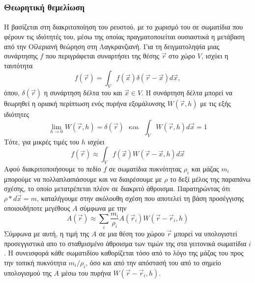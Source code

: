 \subsubsection{Θεωρητική θεμελίωση}
\paragraph{} Η  βασίζεται στη διακριτοποίηση του ρευστού, με το χωρισμό του σε
σωματίδια που φέρουν τις ιδιότητές του, μέσω της οποίας πραγματοποιείται ουσιαστικά η
μετάβαση από την Οϊλεριανή θεώρηση στη Λαγκρανζιανή. Για τη δειγματοληψία μιας συνάρτησης
$f$ που περιγράφεται συναρτήσει της θέσης $\vec{r}$ στο χώρο $V$, ισχύει η ταυτότητα
\begin{equation}
  f(\vec{r}) = \int_Vf(\vec{x}) \delta(\vec{r} - \vec{x}) d\vec{x},
\end{equation}
όπου, $\delta(\vec{r})$ η συνάρτηση δέλτα του  και $\vec{x} \in V$. Η συνάρτηση
δέλτα μπορεί να θεωρηθεί η οριακή περίπτωση ενός πυρήνα εξομάλυνσης $W(\vec{r}, h)$ με τις
εξής ιδιότητες
\begin{equation}
  \label{eq:kernel-properties}
  \lim_{h\to0}W(\vec{r}, h) = \delta(\vec{r})\ \ \
  \text{και}\ \ \
  \int_VW(\vec{r}, h) d\vec{x} = 1
\end{equation}
Τότε, για μικρές τιμές του $h$ ισχύει
\begin{equation}
  \label{eq:c-approx}
  f(\vec{r}) \approx \int_V f(\vec{x}) W(\vec{r}-\vec{x}, h) d\vec{x}
\end{equation}
Αφού διακριτοποιήσουμε το πεδίο $f$ σε σωματίδια πυκνότητας $\rho_i$ και μάζας $m_i$
μπορούμε να πολλαπλασιάσουμε και να διαιρέσουμε με $\rho$ το δεξί μέλος της παραπάνω
σχέσης, το οποίο μετατρέπεται πλέον σε διακριτό άθροισμα.  Παρατηρώντας ότι
$\rho*d\vec{x} = m$, καταλήγουμε στην ακόλουθη σχέση που αποτελεί τη βάση προσέγγισης
οποιουδήποτε μεγέθους $A$ σύμφωνα με την \eng{SPH}
\begin{equation}
  \label{eq:d-approx}
  A(\vec{r}) \approx \sum_i \frac{m_i}{\rho_i} A(\vec{r}_i) W(\vec{r}-\vec{r}_i, h)
\end{equation}
Σύμφωνα με αυτή, η τιμή της $A$ σε μια θέση του χώρου $\vec{r}$ μπορεί να υπολογιστεί
προσεγγιστικά απο το σταθμισμένο άθροισμα των τιμών της στα γειτονικά σωματίδια $i$.  Η
συνεισφορά κάθε σωματιδίου καθορίζεται τόσο από το λόγο της μάζας του προς την τοπική
πυκνότητα $m_i/\rho_i$, όσο και από την απόστασή του από το σημείο υπολογισμού της $A$
μέσω του πυρήνα $W(\vec{r}-\vec{r}_i, h)$.

